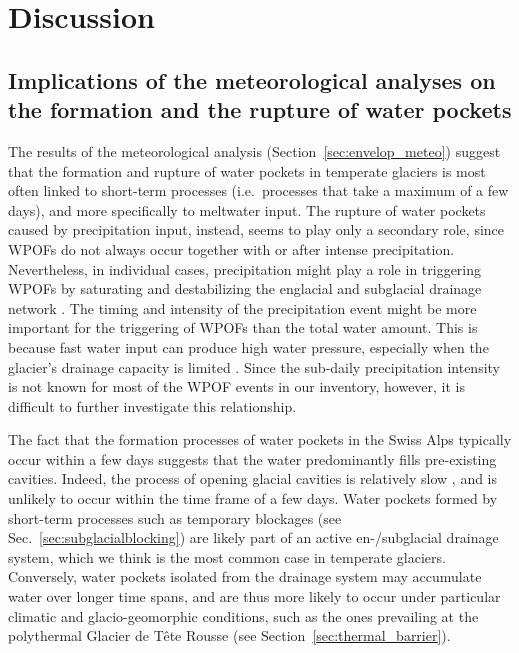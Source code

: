 \section{ Discussion}

\subsection{ Implications of the meteorological analyses on the formation and the rupture of water pockets}

The results of the meteorological analysis (Section~\ref{sec:envelop_meteo}) suggest that the formation and rupture of water pockets in temperate glaciers is most often linked to short-term processes (i.e.\ processes that take a maximum of a few days), and more specifically to meltwater input. The rupture of water pockets caused by precipitation input, instead, seems to play only a secondary role, since WPOFs do not always occur together with or after intense precipitation. Nevertheless, in individual cases, precipitation might play a role in triggering WPOFs by saturating and destabilizing the englacial and subglacial drainage network \citep[e.g.][]{Warburton&Fenn1994}. The timing and intensity of the precipitation event might be more important for the triggering of WPOFs than the total water amount. This is because fast water input can produce high water pressure, especially when the glacier's drainage capacity is limited \citep[e.g.][]{Warburton&Fenn1994,Sugiyama&Gudmundsson2004}. Since the sub-daily precipitation intensity is not known for most of the WPOF events in our inventory, however, it is difficult to further investigate this relationship.

The fact that the formation processes of water pockets in the Swiss Alps typically occur within a few days suggests that the water predominantly fills pre-existing cavities. Indeed, the process of opening glacial cavities is relatively slow \citep[e.g.][]{Vincent&al2015}, and is unlikely to occur within the time frame of a few days. Water pockets formed by short-term processes such as temporary blockages (see Sec.~\ref{sec:subglacialblocking}) are likely part of an active en-/subglacial drainage system, which we think is the most common case in temperate glaciers. Conversely, water pockets isolated from the drainage system may accumulate water over longer time spans, and are thus more likely to occur under particular climatic and glacio-geomorphic conditions, such as the ones prevailing at the polythermal Glacier de Tête Rousse (see Section~\ref{sec:thermal_barrier}).


